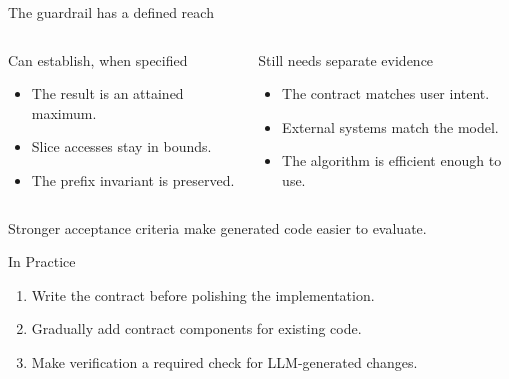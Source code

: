 \begin{frame}{The guardrail has a defined reach}
\begin{columns}[T]
\begin{block}{Can establish, when specified}
\begin{itemize}
\item The result is an attained maximum.
\item Slice accesses stay in bounds.
\item The prefix invariant is preserved.
\end{itemize}
\end{block}
\begin{block}{Still needs separate evidence}
\begin{itemize}
\item The contract matches user intent.
\item External systems match the model.
\item The algorithm is efficient enough to use.
\end{itemize}
\end{block}
\end{columns}
\vspace{6mm}
\large Stronger acceptance criteria make generated code easier to evaluate.
\end{frame}

\begin{frame}{In Practice}
\begin{enumerate}
\item Write the contract before polishing the implementation.
\item Gradually add contract components for existing code.
\item Make verification a required check for LLM-generated changes.
\end{enumerate}
\vspace{6mm}
\end{frame}

